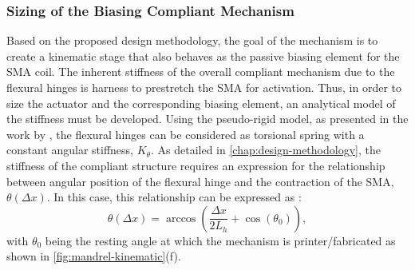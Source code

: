 \subsubsection{Sizing of the Biasing Compliant Mechanism}
Based on the proposed design methodology, the goal of the mechanism is to create a kinematic stage that also behaves as the passive biasing element for the SMA coil. The inherent stiffness of the overall compliant mechanism due to the flexural hinges is harness to prestretch the SMA for activation. Thus, in order to size the actuator and the corresponding biasing element, an analytical model of the stiffness must be developed. Using the pseudo-rigid model, as presented in the work by \cite{heneinConceptionStructuresArticulees2005}, the flexural hinges can be considered as torsional spring with a constant angular stiffness, $K_\theta$. As detailed in \cref{chap:design-methodology}, the stiffness of the compliant structure requires an expression for the relationship between angular position of the flexural hinge and the contraction of the SMA, $\theta(\Delta x)$. In this case, this relationship can be expressed as :
\begin{equation}\label{eq:mandrel-theta-model}
\theta(\Delta x) = \arccos{\left(\frac{\Delta x}{2L_{h}} + \cos(\theta_0)\right)},
\end{equation}
with $\theta_0$ being the resting angle at which the mechanism is printer/fabricated as shown in \cref{fig:mandrel-kinematic}(f).

